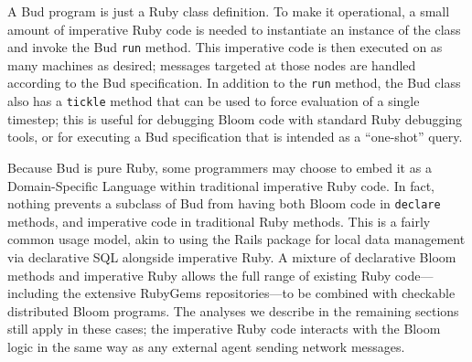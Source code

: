 A Bud program is just a Ruby class definition.  To make it operational, a small amount of imperative Ruby code is needed to instantiate an instance of the class and invoke the Bud {\tt run} method.  This imperative code is then executed on as many machines as desired; messages targeted at those nodes are handled according to the Bud specification.  In addition to the {\tt run} method, the Bud class also has a {\tt tickle} method that can be used to force evaluation of a single timestep; this is useful for debugging Bloom code with standard Ruby debugging tools, or for executing a Bud specification that is intended as a ``one-shot'' query.

Because Bud is pure Ruby, some programmers may choose to embed it as a Domain-Specific Language within traditional imperative Ruby code.  In fact, nothing prevents a subclass of Bud from having both Bloom code in {\tt declare} methods, and imperative code in traditional Ruby methods.  This is a fairly common usage model, akin to using the Rails package for local data management via declarative SQL alongside imperative Ruby. A mixture of declarative Bloom methods and imperative Ruby allows the full range of existing Ruby code---including the extensive RubyGems repositories---to be combined with checkable distributed Bloom programs. The analyses we describe in the remaining sections still apply in these cases; the imperative Ruby code interacts with the Bloom logic in the same way as any external agent sending network messages.